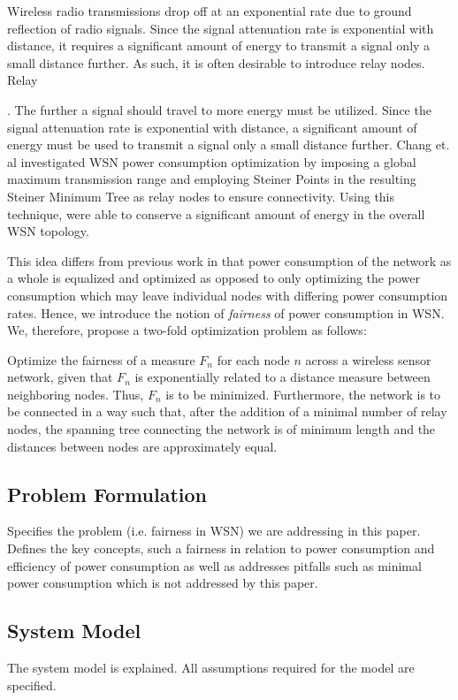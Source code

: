 Wireless radio transmissions drop off at an exponential rate due to ground reflection of radio signals. Since the signal attenuation rate is exponential with distance, it requires a significant amount of energy to transmit a signal only a small distance further. As such, it is often desirable to introduce relay nodes. Relay


. The further a signal should travel to more energy must be utilized. Since the signal attenuation rate is exponential with distance, a significant amount of energy must be used to transmit a signal only a small distance further. Chang et. al \cite{RelaySensor} investigated WSN power consumption optimization by imposing a global maximum transmission range and employing Steiner Points in the resulting Steiner Minimum Tree as relay nodes to ensure connectivity. Using this technique, \cite{RelaySensor} were able to conserve a significant amount of energy in the overall WSN topology.




This idea differs from previous work in that power consumption of the network as a whole is equalized and optimized as opposed to only optimizing the power consumption which may leave individual nodes with differing power consumption rates. Hence, we introduce the notion of \textit{fairness} of power consumption in WSN. We, therefore, propose a two-fold optimization problem as follows:


Optimize the fairness of a measure $F_n$ for each node $n$ across a wireless sensor network, given that $F_n$ is exponentially related to a distance measure between neighboring nodes. Thus, $F_n$ is to be minimized. Furthermore, the network is to be connected in a way such that, after the addition of a minimal number of relay nodes, the spanning tree connecting the network is of minimum length and the distances between nodes are approximately equal.

\subsection{Problem Formulation}
Specifies the problem (i.e. fairness in WSN) we are addressing in this paper. Defines the key concepts, such a fairness in relation to power consumption and efficiency of power consumption as well as addresses pitfalls such as minimal power consumption which is not addressed by this paper.
\subsection{System Model}
The system model is explained. All assumptions required for the model are specified.

